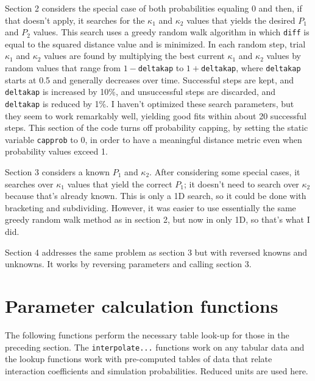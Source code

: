 \documentclass[11pt]{article}
\newcommand {\ttt} {\texttt}
\begin{document}
\begin{description}
Section 2 considers the special case of both probabilities equaling 0 and then, if that doesn't apply, it searches for the $\kappa_1$ and $\kappa_2$ values that yields the desired $P_1$ and $P_2$ values. This search uses a greedy random walk algorithm in which \ttt{diff} is equal to the squared distance value and is minimized. In each random step, trial $\kappa_1$ and $\kappa_2$ values are found by multiplying the best current $\kappa_1$ and $\kappa_2$ values by random values that range from $1-$\ttt{deltakap} to $1+$\ttt{deltakap}, where \ttt{deltakap} starts at 0.5 and generally decreases over time. Successful steps are kept, and \ttt{deltakap} is increased by 10\%, and unsuccessful steps are discarded, and \ttt{deltakap} is reduced by 1\%. I haven't optimized these search parameters, but they seem to work remarkably well, yielding good fits within about 20 successful steps. This section of the code turns off probability capping, by setting the static variable \ttt{capprob} to 0, in order to have a meaningful distance metric even when probability values exceed 1.

Section 3 considers a known $P_1$ and $\kappa_2$. After considering some special cases, it searches over $\kappa_1$ values that yield the correct $P_1$; it doesn't need to search over $\kappa_2$ because that's already known. This is only a 1D search, so it could be done with bracketing and subdividing. However, it was easier to use essentially the same greedy random walk method as in section 2, but now in only 1D, so that's what I did.

Section 4 addresses the same problem as section 3 but with reversed knowns and unknowns. It works by reversing parameters and calling section 3.

\end{description}

\section{Parameter calculation functions}

The following functions perform the necessary table look-up for those in the preceding section. The \ttt{interpolate...} functions work on any tabular data and the lookup functions work with pre-computed tables of data that relate interaction coefficients and simulation probabilities. Reduced units are used here.
\end{document}
